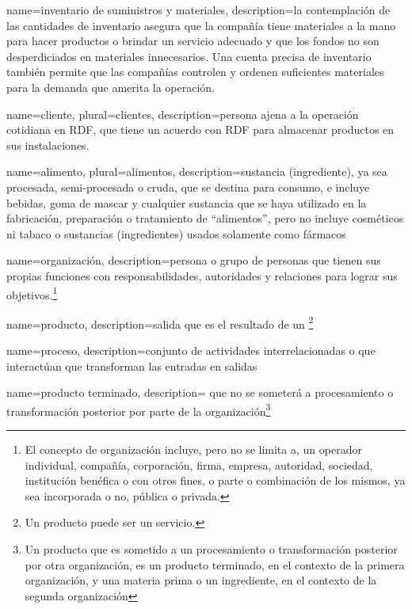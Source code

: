 {
    name=inventario de suministros y materiales,
    description=la contemplación de las cantidades de inventario asegura que la compañía tiene materiales a la mano para hacer productos o brindar un servicio adecuado y que los fondos no son desperdiciados en materiales innecesarios. Una cuenta precisa de inventario también permite que las compañías controlen y ordenen suficientes materiales para la demanda que amerita la operación.
}

{
    name=cliente,
    plural=clientes,
    description={persona ajena a la operación cotidiana en RDF, que tiene un acuerdo con RDF para almacenar productos en sus instalaciones.}
}

{
    name={alimento},
    plural={alimentos},
    description={sustancia (ingrediente), ya sea procesada, semi-procesada o cruda, que se destina para consumo, e incluye bebidas, goma de mascar y cualquier sustancia que se haya utilizado en la fabricación, preparación o tratamiento de “alimentos”, pero no incluye cosméticos ni tabaco o sustancias (ingredientes) usados solamente como fármacos}
}

{
    name=organización,
    description={persona o grupo de personas que tienen sus propias funciones con responsabilidades, autoridades y relaciones para lograr sus objetivos.\footnote{El concepto de organización incluye, pero no se limita a, un operador individual, compañía, corporación, firma, empresa, autoridad, sociedad, institución benéfica o con otros fines, o parte o combinación de los mismos, ya sea incorporada o no, pública o privada.}}
}

{
    name=producto,
    description={salida que es el resultado de un \footnote{Un producto puede ser un servicio.}}
}

{
    name=proceso,
    description={conjunto de actividades interrelacionadas o que interactúan que transforman las entradas en salidas}
}

{
    name=producto terminado,
    description={ que no se someterá a procesamiento o transformación posterior por parte de la organización\footnote{Un producto que es sometido a un procesamiento o transformación posterior por otra organización, es un producto terminado, en el contexto de la primera organización, y una materia prima o un ingrediente, en el contexto de la segunda organización}}
}


